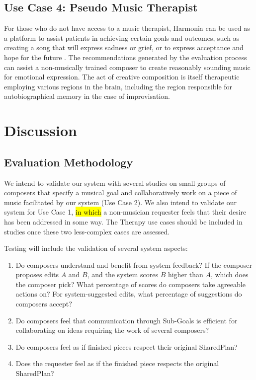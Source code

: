 \documentclass[final,authoryear,5p,times,twocolumn]{elsarticle}
\begin{document}
\subsection{Use Case 4: Pseudo Music Therapist}

For those who do not have access to a music therapist, Harmonia can be used as a platform to assist patients in achieving certain goals and outcomes, such as creating a song that will express sadness or grief, or to express acceptance and hope for the future \citep{dalton2006grief}. The recommendations generated by the evaluation process can assist a non-musically trained composer to create reasonably sounding music for emotional expression. The act of creative composition is itself therapeutic employing various regions in the brain, including the region responsible for autobiographical memory in the case of improvisation. \citep{hilliard2001effects,bensimon2008drumming,limb2008neural,carr2012group} 

\section{Discussion}

\subsection{Evaluation Methodology}
 
We intend to validate our system with several studies on small groups of composers that specify a musical goal and collaboratively work on a piece of music facilitated by our system (Use Case 2). We also intend to validate our system for Use Case 1, \hl{in which} a non-musician requester feels that their desire has been addressed in some way. The Therapy use cases should be included in studies once these two less-complex cases are assessed.

Testing will include the validation of several system aspects:

\begin{enumerate}

\item Do composers understand and benefit from system feedback? If the composer proposes edits $A$ and $B$, and the system scores $B$ higher than $A$, which does the composer pick? What percentage of scores do composers take agreeable actions on? For system-suggested edits, what percentage of suggestions do composers accept?

\item Do composers feel that communication through Sub-Goals is efficient for collaborating on ideas requiring the work of several composers?

\item Do composers feel as if finished pieces respect their original SharedPlan?

\item Does the requester feel as if the finished piece respects the original SharedPlan?

\end{enumerate}
\end{document}
